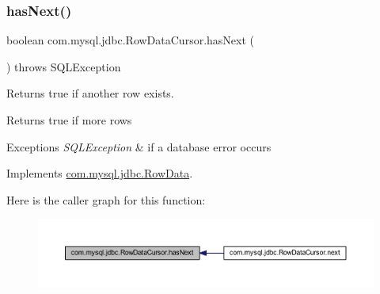 \mbox{\label{classcom_1_1mysql_1_1jdbc_1_1_row_data_cursor_a1d8d73e103d1c80332773c360103314f}} 
\subsubsection{\texorpdfstring{has\+Next()}{hasNext()}}
{\footnotesize\ttfamily boolean com.\+mysql.\+jdbc.\+Row\+Data\+Cursor.\+has\+Next (\begin{DoxyParamCaption}{ }\end{DoxyParamCaption}) throws S\+Q\+L\+Exception}

Returns true if another row exists.

\begin{DoxyReturn}{Returns}
true if more rows 
\end{DoxyReturn}

\begin{DoxyExceptions}{Exceptions}
{\em S\+Q\+L\+Exception} & if a database error occurs \\
\hline
\end{DoxyExceptions}


Implements \mbox{\hyperlink{interfacecom_1_1mysql_1_1jdbc_1_1_row_data_a630ce5b4cd86f8b4d7f71548797c4c16}{com.\+mysql.\+jdbc.\+Row\+Data}}.

Here is the caller graph for this function\+:
\nopagebreak
\begin{figure}[H]
\begin{center}
\leavevmode
\includegraphics[width=350pt]{classcom_1_1mysql_1_1jdbc_1_1_row_data_cursor_a1d8d73e103d1c80332773c360103314f_icgraph}
\end{center}
\end{figure}
\mbox{\label{classcom_1_1mysql_1_1jdbc_1_1_row_data_cursor_a10bcae5f8f9281ca74dae8f107f8ebed}} 
